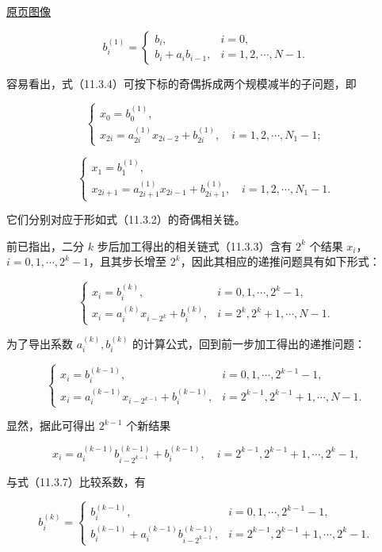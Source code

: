 \href{source-images/pdf-287.jpeg}{原页图像}

\[
b_i^{(1)}=
\begin{cases}
b_i,& i=0,\\
b_i+a_i b_{i-1},& i=1,2,\cdots,N-1.
\end{cases}
\tag{11.3.6}
\]

容易看出，式（11.3.4）可按下标的奇偶拆成两个规模减半的子问题，即

\[
\begin{cases}
x_0=b_0^{(1)},\\
x_{2i}=a_{2i}^{(1)}x_{2i-2}+b_{2i}^{(1)},\quad i=1,2,\cdots,N_1-1;
\end{cases}
\]

\[
\begin{cases}
x_1=b_1^{(1)},\\
x_{2i+1}=a_{2i+1}^{(1)}x_{2i-1}+b_{2i+1}^{(1)},\quad i=1,2,\cdots,N_1-1.
\end{cases}
\]

它们分别对应于形如式（11.3.2）的奇偶相关链。

前已指出，二分 \(k\) 步后加工得出的相关链式（11.3.3）含有 \(2^k\) 个结果 \(x_i\)，\(i=0,1,\cdots,2^k-1\)，且其步长增至 \(2^k\)，因此其相应的递推问题具有如下形式：

\[
\begin{cases}
x_i=b_i^{(k)},& i=0,1,\cdots,2^k-1,\\
x_i=a_i^{(k)}x_{i-2^k}+b_i^{(k)},& i=2^k,2^k+1,\cdots,N-1.
\end{cases}
\tag{11.3.7}
\]

为了导出系数 \(a_i^{(k)},b_i^{(k)}\) 的计算公式，回到前一步加工得出的递推问题：

\[
\begin{cases}
x_i=b_i^{(k-1)},& i=0,1,\cdots,2^{k-1}-1,\\
x_i=a_i^{(k-1)}x_{i-2^{k-1}}+b_i^{(k-1)},& i=2^{k-1},2^{k-1}+1,\cdots,N-1.
\end{cases}
\tag{11.3.8}
\]

显然，据此可得出 \(2^{k-1}\) 个新结果

\[
x_i=a_i^{(k-1)}b_{i-2^{k-1}}^{(k-1)}+b_i^{(k-1)},\quad i=2^{k-1},2^{k-1}+1,\cdots,2^k-1,
\]

与式（11.3.7）比较系数，有

\[
b_i^{(k)}=
\begin{cases}
b_i^{(k-1)},& i=0,1,\cdots,2^{k-1}-1,\\
b_i^{(k-1)}+a_i^{(k-1)}b_{i-2^{k-1}}^{(k-1)},& i=2^{k-1},2^{k-1}+1,\cdots,2^k-1.
\end{cases}
\tag{11.3.9}
\]

